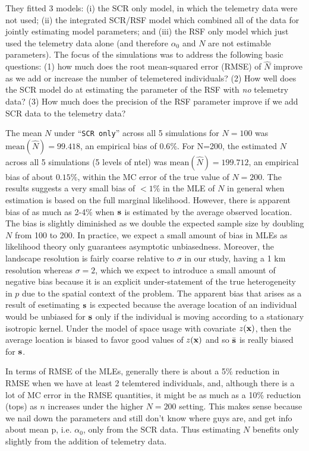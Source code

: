 They fitted 3 models: (i)
the SCR only model, in which the telemetry data were not used; (ii)
the integrated SCR/RSF model which combined all of the data for
jointly estimating model parameters; and (iii) the RSF only model
which just used the telemetry data alone (and therefore $\alpha_{0}$
and $N$ are not estimable parameters).  The focus of the simulations
was to address the following basic questions: (1) how much does the
root mean-squared error (RMSE) of $\hat{N}$ improve as we add or
increase the number of telemetered individuals?  (2) How well does the
SCR model do at estimating the parameter of the RSF with {\it no}
telemetry data?  (3) How much does the precision of the RSF parameter
improve if we add SCR data to the telemetry data?



The mean $N$ under ``\mbox{\tt SCR only}''
across all 5 simulations for $N=100$ was $\mbox{mean}(\hat{N}) = 99.418$, an empirical bias of
$0.6\%$. For N=200, the estimated $N$ across all 5 simulations (5
levels of ntel)  was
$\mbox{mean}(\hat{N}) = 199.712$, an empirical bias of about $0.15\%$, within the MC error of
the true value of $N=200$.
The results suggests a very small bias of $< 1\%$
in the MLE of $N$ in general when estimation is based on the full
marginal likelihood. However, there is apparent bias of as much as 2-4\% when ${\bf s}$ is
estimated by the average observed location.
The bias is slightly
diminished  as we double the expected sample size by doubling $N$ from 100 to
200.
  In practice, we expect a
small amount of bias in MLEs as likelihood theory only guarantees
asymptotic unbiasedness.
 Moreover, the landscape resolution is fairly coarse relative
to $\sigma$ in our study, having a 1 km resolution whereas $\sigma =
2$, which we expect to introduce a small amount of negative bias
because it is an explicit under-statement of the true heterogeneity in
$p$ due to the spatial context of the problem.  The apparent bias that
arises as a result of esetimating ${\bf s}$ is expected because the
average location of an individual would be unbiased for ${\bf s}$ only
if the individual is moving according to a stationary isotropic
kernel. Under the model of space usage with covariate $z({\bf x})$,
then the average location is biased to favor good values of $z({\bf
  x})$ and so $\bar{\bf s}$ is really biased for ${\bf s}$.

In terms of RMSE of the MLEs, generally there is about a 5\% reduction
in RMSE when we have at least 2 telemtered individuals,
and, although
there is a lot of MC error in the RMSE quantities, it might be as much
as a 10\% reduction (tops) as $n$ increases under the higher $N=200$ setting. This makes sense because
we nail down the parameters and still don't know where guys are, and
get info about mean p, i.e. $\alpha_{0}$, only from the SCR data. Thus
estimating $N$  benefits only slightly from the addition of telemetry
data.

